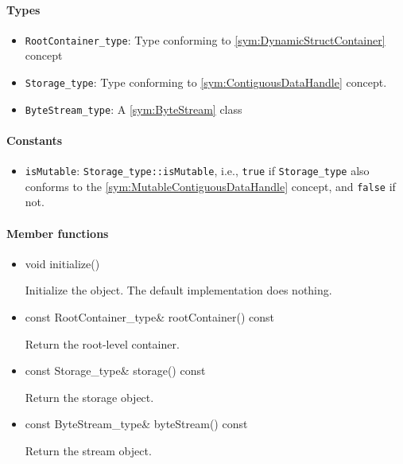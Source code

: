 \paragraph{Types}

\begin{itemize}
	\item \texttt{RootContainer\_type}: Type conforming to \ref{sym:DynamicStructContainer} concept
	\item \texttt{Storage\_type}: Type conforming to \ref{sym:ContiguousDataHandle} concept.
	\item \texttt{ByteStream\_type}: A \ref{sym:ByteStream} class
\end{itemize}

\paragraph{Constants}

\begin{itemize}
	\item \texttt{isMutable}: \texttt{Storage\_type::isMutable}, i.e., \texttt{true} if \texttt{Storage\_type} also conforms to the \ref{sym:MutableContiguousDataHandle} concept, and \texttt{false} if not.
\end{itemize}

\paragraph{Member functions}

\begin{itemize}
	\item
		\begin{cppsnippet}
		void initialize()
		\end{cppsnippet}

		Initialize the object. The default implementation does nothing.

	\item
		\begin{cppsnippet}
		const RootContainer_type& rootContainer() const
		\end{cppsnippet}

		Return the root-level container.

	\item
		\begin{cppsnippet}
		const Storage_type& storage() const
		\end{cppsnippet}

		Return the storage object.

	\item
		\begin{cppsnippet}
		const ByteStream_type& byteStream() const
		\end{cppsnippet}

		Return the stream object.
\end{itemize}


